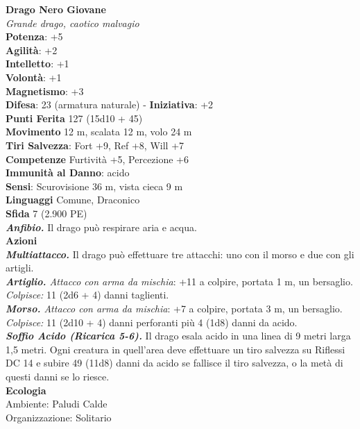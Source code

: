 \begin{multicols}{2}
\medskip\textbf{Drago Nero Giovane}\\
\emph{Grande drago, caotico malvagio}\\
\textbf{Potenza}: +5\\
\textbf{Agilità}: +2\\
\textbf{Intelletto}: +1\\
\textbf{Volontà}: +1\\
\textbf{Magnetismo}: +3\\
\textbf{Difesa}: 23 (armatura naturale) - \textbf{Iniziativa}: +2\\
\textbf{Punti Ferita} 127 (15d10 + 45)\\
\textbf{Movimento} 12 m, scalata 12 m, volo 24 m\\
\textbf{Tiri Salvezza}: Fort +9, Ref +8, Will +7\\
\textbf{Competenze} Furtività +5, Percezione +6\\
\textbf{Immunità al Danno}: acido\\
\textbf{Sensi}: Scurovisione 36 m, vista cieca 9 m\\
\textbf{Linguaggi} Comune, Draconico\\
\textbf{Sfida} 7 (2.900 PE)\smallskip\\
\emph{\textbf{Anfibio.}} Il drago può respirare aria e acqua.\\
\smallskip\textbf{Azioni}\\
\emph{\textbf{Multiattacco.}} Il drago può effettuare tre attacchi: uno con il morso e due con gli artigli.\\
\emph{\textbf{Artiglio.} Attacco con arma da mischia}: +11 a colpire, portata 1 m, un bersaglio.\\
\emph{Colpisce:} 11 (2d6 + 4) danni taglienti.\\
\emph{\textbf{Morso.} Attacco con arma da mischia}: +7 a colpire, portata 3 m, un bersaglio.\\
\emph{Colpisce:} 11 (2d10 + 4) danni perforanti più 4 (1d8) danni da acido.\\
\emph{\textbf{Soffio Acido (Ricarica 5-6).}} Il drago esala acido in una linea di 9 metri larga 1,5 metri. Ogni creatura in quell'area deve effettuare un tiro salvezza su Riflessi DC 14 e subire 49 (11d8) danni da acido se fallisce il tiro salvezza, o la metà di questi danni se lo riesce.\\
\textbf{Ecologia}\\
Ambiente: Paludi Calde\\
Organizzazione: Solitario\\

\end{multicols}
